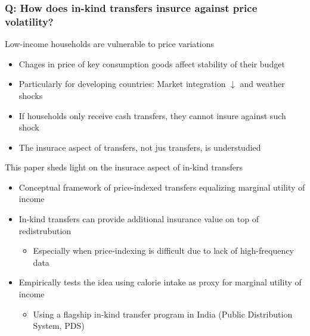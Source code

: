\documentclass[aspectratio=169]{beamer}
\begin{document}
\begin{frame}
\frametitle{Q: How does in-kind transfers insurce against price volatility?} 
Low-income households are vulnerable to price variations
\begin{itemize}\setlength\itemsep{3pt}
\item Chages in price of key consumption goods affect stability of their budget
\item Particularly for developing countries: Market integration $\downarrow$ and weather shocks
\item If households only receive cash transfers, they cannot insure against such shock
\item The insurace aspect of transfers, not jus transfers, is understudied
\end{itemize}\medskip
This paper sheds light on the insurace aspect of in-kind transfers
\begin{itemize}\setlength\itemsep{3pt}
  \item Conceptual framework of price-indexed transfers equalizing marginal utility of income
  \item In-kind transfers can provide additional insurance value on top of redistrubution
  \begin{itemize}\setlength\itemsep{3pt}
  \item Especially when price-indexing is difficult due to lack of high-frequency data
\end{itemize}
\item Empirically tests the idea using calorie intake as proxy for marginal utility of income
\begin{itemize}\setlength\itemsep{3pt}
  \item Using a flagship in-kind transfer program in India (Public Distribution System, PDS)
\end{itemize}
\end{itemize}
\end{frame}
\end{document}
